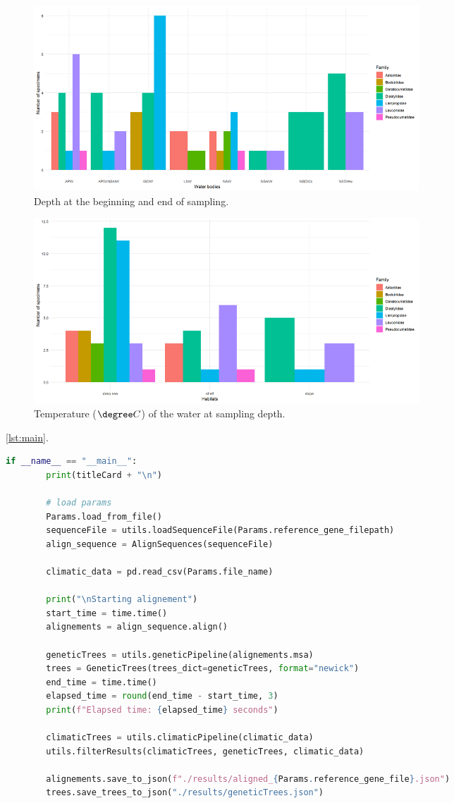 \begin{figure}[]
    \centering
    \includegraphics[width=0.7\textwidth]{figure3.png}
    \caption{Depth at the beginning and end of sampling. \label{fig:fig1c}}
\end{figure}

\begin{figure}[]
    \centering
    \includegraphics[width=0.7\textwidth]{figure4.png}
    \caption{Temperature (\( \degree C \)) of the water at sampling depth. \label{fig:fig1d}}
\end{figure}

\autoref{lst:main}.
\begin{lstlisting}[label=lst:main,language=Python,caption=aPhyloGeo’s main function]
    if __name__ == "__main__":
        print(titleCard + "\n")

        # load params 
        Params.load_from_file()
        sequenceFile = utils.loadSequenceFile(Params.reference_gene_filepath)
        align_sequence = AlignSequences(sequenceFile)

        climatic_data = pd.read_csv(Params.file_name)

        print("\nStarting alignement")
        start_time = time.time()
        alignements = align_sequence.align()

        geneticTrees = utils.geneticPipeline(alignements.msa)
        trees = GeneticTrees(trees_dict=geneticTrees, format="newick")
        end_time = time.time()
        elapsed_time = round(end_time - start_time, 3)
        print(f"Elapsed time: {elapsed_time} seconds")

        climaticTrees = utils.climaticPipeline(climatic_data)
        utils.filterResults(climaticTrees, geneticTrees, climatic_data)

        alignements.save_to_json(f"./results/aligned_{Params.reference_gene_file}.json")
        trees.save_trees_to_json("./results/geneticTrees.json")
\end{lstlisting}

